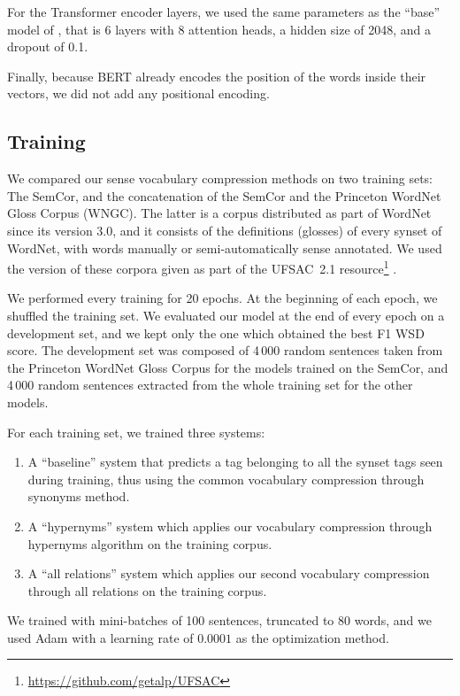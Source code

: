 \documentclass[11pt]{article}
\newcommand{\citep}[1]{\cite{#1}}
\newcommand{\citet}[1]{\newcite{#1}}
\begin{document}
For the Transformer encoder layers, we used the same parameters as the ``base'' model of \citet{vaswani2017}, that is 6 layers with 8 attention heads, a hidden size of 2048, and a dropout of 0.1.

Finally, because BERT already encodes the position of the words inside their vectors, we did not add any positional encoding.



\subsection{Training}

We compared our sense vocabulary compression methods on two training sets: 
The SemCor, and  
the concatenation of the SemCor and the Princeton WordNet Gloss Corpus (WNGC).
The latter is a corpus distributed as part of WordNet since its version 3.0, and it consists of the definitions (glosses) of every synset of WordNet, with 
words manually or semi-automatically sense annotated.
We used the version of these corpora given as part of the UFSAC~2.1 resource\footnote{\url{https://github.com/getalp/UFSAC}} 
\citep{vialhal01718237}.


We performed every training for 20 epochs. 
At the beginning of each epoch, we shuffled the training set. We evaluated our model at the end of every epoch on a development set,
and we kept only the one which obtained the best F1 WSD score. 
The development set was composed of 
4\,000 random sentences taken from the Princeton WordNet Gloss Corpus for the models trained on the SemCor, and 4\,000 random sentences extracted from the whole training set for the other models.

\noindent For each training set, we trained three systems: 
\begin{enumerate}[leftmargin=*,topsep=0pt,itemsep=0pt,parsep=0pt,partopsep=0pt]
    \item 
A ``baseline'' system that predicts a tag belonging to all the synset tags seen during training,
thus using the common 
vocabulary compression through synonyms method.
    \item 
A ``hypernyms'' system which applies our vocabulary compression through hypernyms algorithm on the training corpus.
    \item
A ``all relations'' system which applies our second vocabulary compression through all relations on the training corpus.
\end{enumerate}

\noindent We trained with mini-batches of 100 sentences, truncated to 80 words, 
and we used Adam \cite{KingmaB14} with a learning rate of $0.0001$ as the optimization method.
\end{document}
